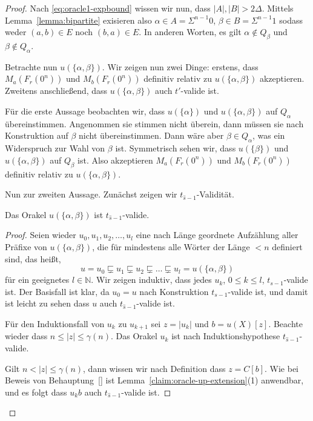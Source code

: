 \begin{proof}
Nach \eqref{eq:oracle1-expbound} wissen wir nun, dass $|A|, |B|>2\Delta$. Mittels Lemma~\ref{lemma:bipartite} exisieren also $\alpha\in A = \Sigma^{n-1}0$, $\beta\in B=\Sigma^{n-1}1$ sodass weder $(a,b)\in E$ noch $(b,a)\in E$.
In anderen Worten, es gilt $\alpha\not\in Q_\beta$ und $\beta\not\in Q_\alpha$.

Betrachte nun $u(\{\alpha, \beta\})$. Wir zeigen nun zwei Dinge: erstens, dass $M_a(F_r(0^n))$ und $M_b(F_r(0^n))$ definitiv relativ zu $u(\{\alpha, \beta\})$ akzeptieren.
Zweitens anschließend, dass $u(\{\alpha,\beta\})$ auch $t'$-valide ist.

Für die erste Aussage beobachten wir, dass $u(\{\alpha\})$ und $u(\{\alpha, \beta\})$ auf $Q_\alpha$ übereinstimmen. Angenommen sie stimmen nicht überein, dann müssen sie nach Konstruktion auf $\beta$ nicht übereinstimmen. Dann wäre aber $\beta\in Q_\alpha$, was ein Widerspruch zur Wahl von $\beta$ ist.
Symmetrisch sehen wir, dass $u(\{\beta\})$ und $u(\{\alpha, \beta\})$ auf $Q_\beta$ ist.
Also akzeptieren $M_a(F_r(0^n))$ und $M_b(F_r(0^n))$ definitiv relativ zu $u(\{\alpha, \beta\})$.

Nun zur zweiten Aussage. Zunächst zeigen wir $t_{\hat{s}-1}$-Validität.
\begin{claim}
    Das Orakel $u(\{\alpha, \beta\})$ ist $t_{\hat{s}-1}$-valide.
\end{claim}
\begin{proof}
    Seien wieder $u_0, u_1, u_2, \dots, u_l$ eine nach Länge geordnete Aufzählung aller Präfixe von $u(\{\alpha, \beta\})$, die für mindestens alle Wörter der Länge $<n$ definiert sind, das heißt, 
    \[ u = u_0 \sqsubsetneq u_1 \sqsubsetneq u_2 \sqsubsetneq \dots \sqsubsetneq u_l = u(\{\alpha,\beta\}) \]
    für ein geeignetes $l\in\mathbb N$.
    Wir zeigen induktiv, dass jedes $u_k$, $0\leq k\leq l$, $t_{s-1}$-valide ist.
    Der Basisfall ist klar, da $u_0 = u$ nach Konstruktion $t_{s-1}$-valide ist, und damit ist leicht zu sehen dass $u$ auch $t_{\hat{s}-1}$-valide ist.

    Für den Induktionsfall von $u_k$ zu $u_{k+1}$ sei $z=|u_k|$ und $b=u(X)[z]$. 
    Beachte wieder dass $n\leq |z|\leq \gamma(n)$.
    Das Orakel $u_k$ ist nach Induktionshypothese $t_{\hat{s}-1}$-valide.

    Gilt $n<|z|\leq \gamma(n)$, dann wissen wir nach Definition dass $z=C[b]$. Wie bei Beweis von Behauptung~\ref{} ist Lemma~\ref{claim:oracle-up-extension}(1) anwendbar, und es folgt dass $u_kb$ auch $t_{\hat{s}-1}$-valide ist.


\end{proof}
\end{proof}
